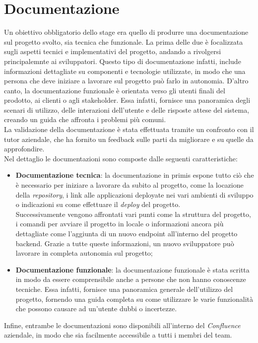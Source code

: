 \section{Documentazione}
Un obiettivo obbligatorio dello stage era quello di produrre una documentazione sul progetto svolto, sia tecnica che funzionale.
La prima delle due è focalizzata sugli aspetti tecnici e implementativi del progetto, andando a rivolgersi principalemnte ai sviluppatori.
Questo tipo di documentazione infatti, include informazioni dettagliate su componenti e tecnologie utilizzate, in modo che una persona che deve iniziare a lavorare sul progetto
può farlo in autonomia.
D'altro canto, la documentazione funzionale è orientata verso gli utenti finali del prodotto, ai clienti o agli stakeholder.
Essa infatti, fornisce una panoramica degli scenari di utilizzo, delle interazioni dell'utente e delle risposte attese del sistema, creando un guida che affronta i problemi più comuni.\\
La validazione della documentazione è stata effettuata tramite un confronto con il tutor aziendale, che ha fornito un feedback sulle parti da migliorare e su quelle da approfondire.\\
Nel dettaglio le documentazioni sono composte dalle seguenti caratteristiche:
\begin{itemize}
  \item \textbf{Documentazione tecnica}: la documentazione in primis espone tutto ciò che è necessario per iniziare a lavorare da subito al progetto, come la locazione della \textit{repository}, i link 
  alle applicazioni deployate nei vari ambienti di sviluppo o indicazioni su come effettuare il \textit{deploy} del progetto.\\
  Successivamente vengono affrontati vari punti come la struttura del progetto, i comandi per avviare il progetto in locale o informazioni ancora più dettagliate come l'aggiunta di un nuovo endpoint all'interno del progetto backend.
  Grazie a tutte queste informazioni, un nuovo sviluppatore può lavorare in completa autonomia sul progetto;
  \item \textbf{Documentazione funzionale}: la documentazione funzionale è stata scritta in modo da essere comprensibile anche a persone che non hanno conoscenze tecniche.
  Essa infatti, fornisce una panoramica generale dell'utilizzo del progetto, fornendo una guida completa su come utilizzare le varie funzionalità che possono
  causare ad un'utente dubbi o incertezze.
\end{itemize}
Infine, entrambe le documentazioni sono disponibili all'interno del \textit{Confluence} aziendale, in modo che sia facilmente accessibile a tutti i membri del team.

